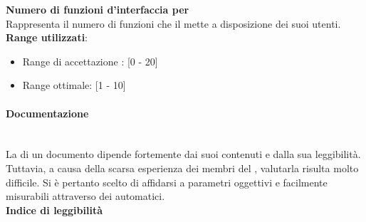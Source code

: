 \textbf{Numero di funzioni d'interfaccia per }\\

Rappresenta il numero di funzioni che il  mette a disposizione dei suoi utenti. \\

\textbf{Range utilizzati}:
\begin{itemize}
	\item Range di accettazione : [0 - 20]
	\item Range ottimale: [1 - 10]
\end{itemize}

\paragraph*{Documentazione}\mbox{}\\
\hypertarget{metriche_documenti}{}
La  di un documento dipende fortemente dai suoi contenuti e dalla sua leggibilità. Tuttavia, a causa della scarsa esperienza dei membri del , valutarla risulta molto difficile. Si è pertanto scelto di affidarsi a parametri oggettivi e facilmente misurabili attraverso dei  automatici.\\

\textbf{Indice di leggibilità}\\

